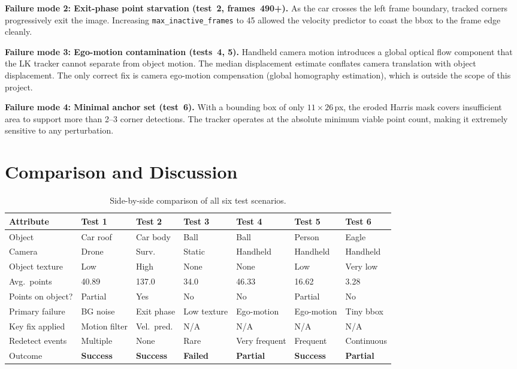 \documentclass[12pt,a4paper]{article}
\begin{document}
\textbf{Failure mode 2: Exit-phase point starvation (test~2, frames~490+).}
As the car crosses the left frame boundary, tracked corners progressively exit the image.
Increasing \texttt{max\_inactive\_frames} to 45 allowed the velocity predictor to coast the
bbox to the frame edge cleanly.

\textbf{Failure mode 3: Ego-motion contamination (tests~4, 5).}
Handheld camera motion introduces a global optical flow component that the LK tracker cannot
separate from object motion. The median displacement estimate conflates camera translation with
object displacement. The only correct fix is camera ego-motion compensation (global homography
estimation), which is outside the scope of this project.

\textbf{Failure mode 4: Minimal anchor set (test~6).}
With a bounding box of only $11\times26$\,px, the eroded Harris mask covers insufficient area
to support more than 2--3 corner detections. The tracker operates at the absolute minimum
viable point count, making it extremely sensitive to any perturbation.

\section{Comparison and Discussion}

\begin{table}[H]
\centering\small
\caption{Side-by-side comparison of all six test scenarios.}
\label{tab:compare}
\renewcommand{\arraystretch}{1.12}
\begin{tabularx}{\textwidth}{lXXXXXX}
\toprule
\rowcolor{accentteal!20}
\textbf{Attribute} & \textbf{Test 1} & \textbf{Test 2} & \textbf{Test 3} & \textbf{Test 4} & \textbf{Test 5} & \textbf{Test 6} \\
\midrule
Object & Car roof & Car body & Ball & Ball & Person & Eagle \\
Camera & Drone & Surv. & Static & Handheld & Handheld & Handheld \\
Object texture & Low & High & None & None & Low & Very low \\
Avg.\ points & 40.89 & 137.0 & 34.0 & 46.33 & 16.62 & 3.28 \\
Points on object? & Partial & Yes & No & No & Partial & No \\
Primary failure & BG noise & Exit phase & Low texture & Ego-motion & Ego-motion & Tiny bbox \\
Key fix applied & Motion filter & Vel.\ pred. & N/A & N/A & N/A & N/A \\
Redetect events & Multiple & None & Rare & Very frequent & Frequent & Continuous \\
Outcome & \textbf{Success} & \textbf{Success} & \textbf{Failed} & \textbf{Partial} & \textbf{Success} & \textbf{Partial} \\
\bottomrule
\end{tabularx}
\end{table}
\end{document}
